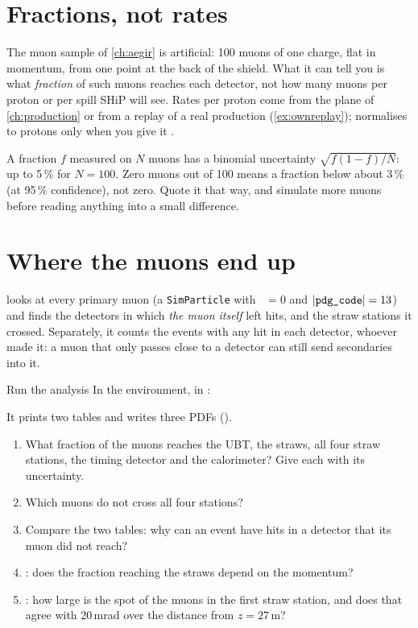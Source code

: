 \section{Fractions, not rates}

The muon sample of \cref{ch:aegir} is artificial: 100 muons of one charge,
flat in momentum, from one point at the back of the shield. What it can tell
you is what \emph{fraction} of such muons reaches each detector, not how many
muons per proton or per spill SHiP will see. Rates per proton come from the
plane of \cref{ch:production} or from a replay of a real production
(\cref{ex:ownreplay});  normalises to protons only
when you give it .

\begin{pitfall}
A fraction $f$ measured on $N$ muons has a binomial uncertainty
$\sqrt{f(1-f)/N}$: up to 5\,\% for $N=100$. Zero muons out of 100 means a
fraction below about 3\,\% (at 95\,\% confidence), not zero. Quote it that
way, and simulate more muons before reading anything into a small difference.
\end{pitfall}

\section{Where the muons end up}

 looks at every primary muon (a
\texttt{SimParticle} with ~$=0$ and $|\texttt{pdg\_code}|=13$)
and finds the detectors in which \emph{the muon itself} left hits, and the
straw stations it crossed. Separately, it counts the events with any hit in
each detector, whoever made it: a muon that only passes close to a detector
can still send secondaries into it.

\begin{exercise}{Run the analysis}
\label{ex:muonbackground}
In the  environment, in :
It prints two tables and writes three PDFs ().
\begin{enumerate}
  \item What fraction of the muons reaches the UBT, the straws, all four
        straw stations, the timing detector and the calorimeter? Give each
        with its uncertainty.
  \item Which muons do not cross all four stations?
  \item Compare the two tables: why can an event have hits in a detector
        that its muon did not reach?
  \item {}: does the fraction reaching the straws depend on the
        momentum?
  \item {}: how large is the spot of the muons in
        the first straw station, and does that agree with 20\,mrad over the
        distance from $z=27$\,m?
\end{enumerate}
\end{exercise}

